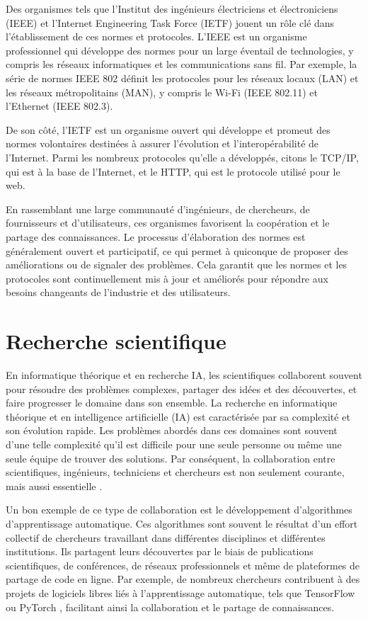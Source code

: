 Des organismes tels que l'Institut des ingénieurs électriciens et électroniciens (IEEE)\cite{IEEE} et l'Internet Engineering Task Force (IETF)\cite{IETF} jouent un rôle clé dans l'établissement de ces normes et protocoles. L'IEEE est un organisme professionnel qui développe des normes pour un large éventail de technologies, y compris les réseaux informatiques et les communications sans fil. Par exemple, la série de normes IEEE 802\cite{IEEE802} définit les protocoles pour les réseaux locaux (LAN) et les réseaux métropolitains (MAN), y compris le Wi-Fi (IEEE 802.11) et l'Ethernet (IEEE 802.3).

De son côté, l'IETF est un organisme ouvert qui développe et promeut des normes volontaires destinées à assurer l'évolution et l'interopérabilité de l'Internet. Parmi les nombreux protocoles qu'elle a développés, citons le TCP/IP\cite{TCPIP}, qui est à la base de l'Internet, et le HTTP\cite{HTTP}, qui est le protocole utilisé pour le web.

En rassemblant une large communauté d'ingénieurs, de chercheurs, de fournisseurs et d'utilisateurs, ces organismes favorisent la coopération et le partage des connaissances. Le processus d'élaboration des normes est généralement ouvert et participatif, ce qui permet à quiconque de proposer des améliorations ou de signaler des problèmes. Cela garantit que les normes et les protocoles sont continuellement mis à jour et améliorés pour répondre aux besoins changeants de l'industrie et des utilisateurs.

\section{Recherche scientifique}
En informatique théorique et en recherche IA, les scientifiques collaborent souvent pour résoudre des problèmes complexes, partager des idées et des découvertes, et faire progresser le domaine dans son ensemble.
La recherche en informatique théorique et en intelligence artificielle (IA) est caractérisée par sa complexité et son évolution rapide. Les problèmes abordés dans ces domaines sont souvent d'une telle complexité qu'il est difficile pour une seule personne ou même une seule équipe de trouver des solutions. Par conséquent, la collaboration entre scientifiques, ingénieurs, techniciens et chercheurs est non seulement courante, mais aussi essentielle \cite{gupta_collaborative_2019}.

Un bon exemple de ce type de collaboration est le développement d'algorithmes d'apprentissage automatique. Ces algorithmes sont souvent le résultat d'un effort collectif de chercheurs travaillant dans différentes disciplines et différentes institutions. Ils partagent leurs découvertes par le biais de publications scientifiques, de conférences, de réseaux professionnels et même de plateformes de partage de code en ligne. Par exemple, de nombreux chercheurs contribuent à des projets de logiciels libres liés à l'apprentissage automatique, tels que TensorFlow \cite{abadi_tensorflow:_2016} ou PyTorch \cite{paszke_pytorch:_2019}, facilitant ainsi la collaboration et le partage de connaissances.

